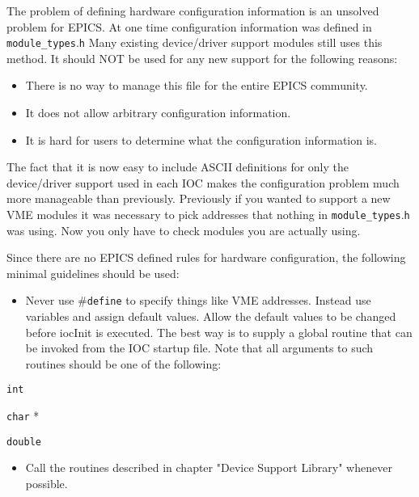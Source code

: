The problem of defining hardware configuration information is an unsolved problem for EPICS. At one time 
configuration information was defined in \verb|module_types|.\verb|h| Many existing device/driver support modules still uses this 
method. It should NOT be used for any new support for the following reasons:

\begin{itemize}\item There is no way to manage this file for the entire EPICS community.

\item It does not allow arbitrary configuration information.

\item It is hard for users to determine what the configuration information is.

\end{itemize}The fact that it is now easy to include ASCII definitions for only the device/driver support used in each IOC makes the 
configuration problem much more manageable than previously. Previously if you wanted to support a new VME modules 
it was necessary to pick addresses that nothing in \verb|module_types|.\verb|h| was using. Now you only have to check modules 
you are actually using.

Since there are no EPICS defined rules for hardware configuration, the following minimal guidelines should be used:

\begin{itemize}\item Never use \#\verb|define| to specify things like VME addresses. Instead use variables and assign default values. Allow 
the default values to be changed before iocInit is executed. The best way is to supply a global routine that can be 
invoked from the IOC startup file. Note that all arguments to such routines should be one of the following:

\end{itemize}\verb|int|

\verb|char| *

\verb|double|

\begin{itemize}\item Call the routines described in chapter "Device Support Library" whenever possible.

\end{itemize}






